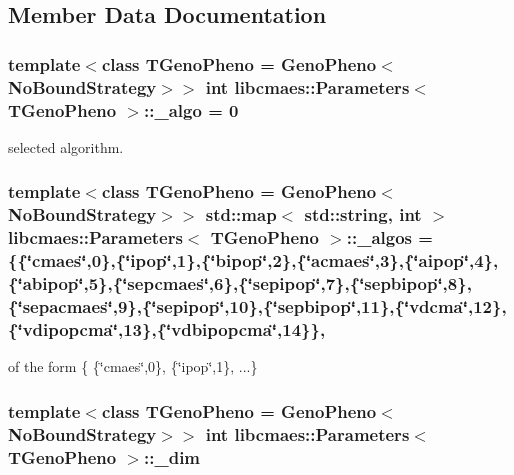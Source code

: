 \subsection{Member Data Documentation}
\hypertarget{classlibcmaes_1_1Parameters_a7a5fc681b0c7294ef050ace344f923db}{
\subsubsection[{\-\_\-algo}]{\setlength{\rightskip}{0pt plus 5cm}template$<$class T\-Geno\-Pheno = Geno\-Pheno$<$\-No\-Bound\-Strategy$>$$>$ int {\bf libcmaes\-::\-Parameters}$<$ T\-Geno\-Pheno $>$\-::\-\_\-algo = 0\hspace{0.3cm}{\ttfamily [protected]}}}\label{classlibcmaes_1_1Parameters_a7a5fc681b0c7294ef050ace344f923db}
selected algorithm. \hypertarget{classlibcmaes_1_1Parameters_a5d2fd0ca871efd0f4f4b223515544204}{
\subsubsection[{\-\_\-algos}]{\setlength{\rightskip}{0pt plus 5cm}template$<$class T\-Geno\-Pheno = Geno\-Pheno$<$\-No\-Bound\-Strategy$>$$>$ std\-::map$<$ std\-::string, int $>$ {\bf libcmaes\-::\-Parameters}$<$ T\-Geno\-Pheno $>$\-::\-\_\-algos = \{\{\char`\"{}cmaes\char`\"{},0\},\{\char`\"{}ipop\char`\"{},1\},\{\char`\"{}bipop\char`\"{},2\},\{\char`\"{}acmaes\char`\"{},3\},\{\char`\"{}aipop\char`\"{},4\},\{\char`\"{}abipop\char`\"{},5\},\{\char`\"{}sepcmaes\char`\"{},6\},\{\char`\"{}sepipop\char`\"{},7\},\{\char`\"{}sepbipop\char`\"{},8\},\{\char`\"{}sepacmaes\char`\"{},9\},\{\char`\"{}sepipop\char`\"{},10\},\{\char`\"{}sepbipop\char`\"{},11\},\{\char`\"{}vdcma\char`\"{},12\},\{\char`\"{}vdipopcma\char`\"{},13\},\{\char`\"{}vdbipopcma\char`\"{},14\}\}\hspace{0.3cm}{\ttfamily [static]}, {\ttfamily [protected]}}}\label{classlibcmaes_1_1Parameters_a5d2fd0ca871efd0f4f4b223515544204}
of the form \{ \{\char`\"{}cmaes\char`\"{},0\}, \{\char`\"{}ipop\char`\"{},1\}, ...\} \hypertarget{classlibcmaes_1_1Parameters_affc62ae5c5f1db4f88e4c2dc96387af6}{
\subsubsection[{\-\_\-dim}]{\setlength{\rightskip}{0pt plus 5cm}template$<$class T\-Geno\-Pheno = Geno\-Pheno$<$\-No\-Bound\-Strategy$>$$>$ int {\bf libcmaes\-::\-Parameters}$<$ T\-Geno\-Pheno $>$\-::\-\_\-dim\hspace{0.3cm}{\ttfamily [protected]}}}\label{classlibcmaes_1_1Parameters_affc62ae5c5f1db4f88e4c2dc96387af6}
